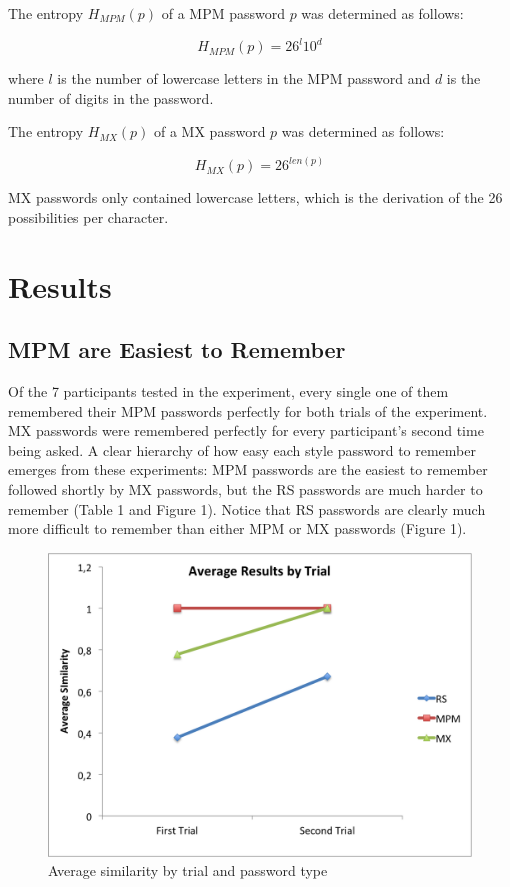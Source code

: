 \documentclass{article}
\begin{document}
The entropy $H_{MPM}(p)$ of a MPM password $p$ was determined as follows:

$$H_{MPM}(p) = 26^l10^d$$

where $l$ is the number of lowercase letters in the MPM password and $d$ is the number of digits in the password.

The entropy  $H_{MX}(p)$ of a MX password $p$ was determined as follows:

$$H_{MX}(p) = 26^{len(p)}$$

MX passwords only contained lowercase letters, which is the derivation of the 26 possibilities per character.

\FloatBarrier
\section*{Results}
\subsection*{MPM are Easiest to Remember}
Of the 7 participants tested in the experiment, every single one of them remembered their MPM passwords perfectly for both trials of the experiment. MX passwords were remembered perfectly for every participant's second time being asked. A clear hierarchy of how easy each style password to remember emerges from these experiments: MPM passwords are the easiest to remember followed shortly by MX passwords, but the RS passwords are much harder to remember (Table 1 and Figure 1). Notice that RS passwords are clearly much more difficult to remember than either MPM or MX passwords (Figure 1).
\begin{figure}
\centering
\includegraphics[scale=0.75]{resultsByTrial.png}
\caption{Average similarity by trial and password type}
\end{figure}
\end{document}
